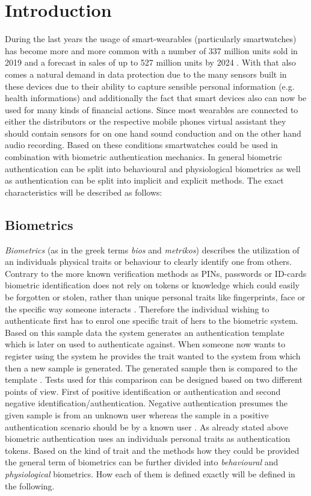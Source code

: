 \section{Introduction}
During the last years the usage of smart-wearables (particularly smartwatches) has become more and more common with a number of 337 million units sold in 2019 and a forecast in sales of up to 527 million units by 2024 \cite{tenzer}.
With that also comes a natural demand in data protection due to the many sensors built in these devices due to their ability to capture sensible personal information (e.g. health informations) and additionally the fact that smart devices also can now be used for many kinds of financial actions.\newline
Since most wearables are connected to either the distributors or the respective mobile phones virtual assistant they should contain sensors for on one hand sound conduction and on the other hand audio recording.\newline
Based on these conditions smartwatches could be used in combination with biometric authentication mechanics.\newline
In general biometric authentication can be split into behavioural and physiological biometrics as well as authentication can be split into implicit and explicit methods. The exact characteristics will be described as follows: 
\subsection{Biometrics}
\textit{Biometrics} (as in the greek terms \textit{bios} and \textit{metrikos}) describes the utilization of an individuals physical traits or behaviour to clearly identify one from others. Contrary to the more known verification methods as PINs, passwords or ID-cards biometric identification does not rely on tokens or knowledge which could easily be forgotten or stolen, rather than unique personal traits like fingerprints, face or the specific way someone interacts \cite[chpt. 1.1]{jain2007handbook}\cite{delac2004survey}. Therefore the individual wishing to authenticate first has to enrol one specific trait of hers to the biometric system. Based on this sample data the system generates an authentication template which is later on used to authenticate against.\newpage\noindent  
When someone now wants to register using the system he provides the trait wanted to the system from which then a new sample is generated. The generated sample then is compared to the template \cite{alsaadi2015physiological}.\newline
Tests used for this comparison can be designed based on two different points of view. First of positive identification or authentication and second negative identification/authentication. Negative authentication presumes the given sample is from an unknown user whereas the sample in a positive authentication scenario should be by a known user \cite{wayman2005introduction}.
As already stated above biometric authentication uses an individuals personal traits as authentication tokens. Based on the kind of trait and the methods how they could be provided the general term of biometrics can be further divided into \textit{behavioural} and \textit{physiological} biometrics. How each of them is defined exactly will be defined in the following.
